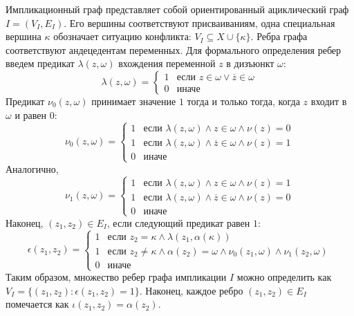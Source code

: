Импликационный граф представляет собой ориентированный ациклический граф $I = \left(V_I, E_I \right)$. 
Его вершины соответствуют присваиваниям, одна специальная вершина $\kappa$ обозначает ситуацию конфликта: $V_I \subseteq X \cup \{ \kappa \} $.
Ребра графа соответствуют андецедентам переменных. 
Для формального определения ребер введем предикат $\lambda(z, \omega)$ вхождения переменной $z$ в дизъюнкт $\omega$:
\begin{equation*}
\lambda(z, \omega) = 
\begin{cases}
1 & \text{если } z \in \omega \lor \overline{z} \in \omega \\
0 & \text{иначе}
\end{cases}
\end{equation*}
Предикат $\nu_0(z, \omega)$ принимает значение $1$ тогда и только тогда, когда $z$ входит в $\omega$ и равен $0$:
\begin{equation*}
\nu_0(z, \omega) = 
\begin{cases}
1 & \text{если } \lambda(z, \omega) \land z \in \omega \land \nu(z) = 0 \\
1 & \text{если } \lambda(z, \omega) \land \overline{z} \in \omega \land \nu(z) = 1 \\
0 & \text{иначе}
\end{cases}
\end{equation*}
Аналогично,
\begin{equation*}
\nu_1(z, \omega) = 
\begin{cases}
1 & \text{если } \lambda(z, \omega) \land z \in \omega \land \nu(z) = 1 \\
1 & \text{если } \lambda(z, \omega) \land \overline{z} \in \omega \land \nu(z) = 0 \\
0 & \text{иначе}
\end{cases}
\end{equation*}
Наконец, $(z_1, z_2) \in E_I$, если следующий предикат равен $1$:
\begin{equation*}
\epsilon(z_1, z_2) = 
\begin{cases}
1 & \text{если } z_2 = \kappa \land \lambda(z_1, \alpha(\kappa)) \\
1 & \text{если } z_2 \ne \kappa \land \alpha(z_2)=\omega \land \nu_0(z_1, \omega) \land \nu_1(z_2, \omega) \\
0 & \text{иначе}
\end{cases}
\end{equation*}
Таким образом, множество ребер графа импликации $I$ можно определить как $V_I = \{ (z_1, z_2): \epsilon(z_1, z_2) = 1\}$. Наконец, каждое ребро $(z_1, z_2) \in E_I$ помечается как $\iota(z_1, z_2) = \alpha(z_2)$.


